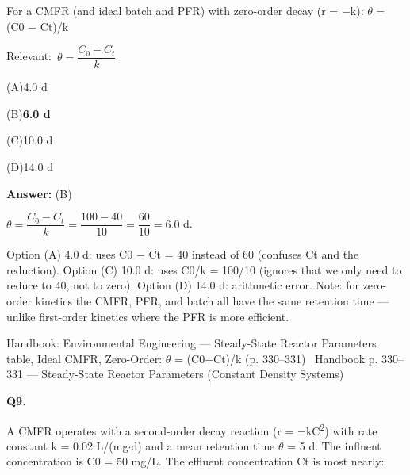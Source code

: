 \documentclass[11pt]{article}
\newcommand{\correct}[1]{\textbf{#1}\;{\color{accent}$\checkmark$}}
\newcommand{\optline}[2]{\par\noindent\hspace{1.2em}(#1)\hspace{0.6em}#2}
\begin{document}
For a CMFR (and ideal batch and PFR) with zero-order decay (r = $-$k): $\theta$ = (C0 $-$ Ct)/k\par\vspace{3pt}
{\small\color{soft}Relevant:}\ $\theta = \dfrac{C_0 - C_t}{k}$\par\vspace{3pt}
\optline{A}{4.0 d}
\optline{B}{\correct{6.0 d}}
\optline{C}{10.0 d}
\optline{D}{14.0 d}
\par\vspace{3pt}
\vspace{2pt}\par\noindent\colorbox{boxbg}{\parbox{\dimexpr\linewidth-2\fboxsep\relax}{%
\vspace{2pt}\textbf{Answer:} (B)\par\vspace{2pt}
{\small $\theta = \dfrac{C_0 - C_t}{k} = \dfrac{100 - 40}{10} = \dfrac{60}{10} = 6.0$ d.

Option (A) 4.0 d: uses C0 $-$ Ct = 40 instead of 60 (confuses Ct and the reduction). Option (C) 10.0 d: uses C0/k = 100/10 (ignores that we only need to reduce to 40, not to zero). Option (D) 14.0 d: arithmetic error. Note: for zero-order kinetics the CMFR, PFR, and batch all have the same retention time --- unlike first-order kinetics where the PFR is more efficient.}\par\vspace{2pt}
{\footnotesize\color{soft}Handbook: Environmental Engineering --- Steady-State Reactor Parameters table, Ideal CMFR, Zero-Order: $\theta$ = (C0$-$Ct)/k (p. 330--331) \textbullet\ Handbook p. 330--331 --- Steady-State Reactor Parameters (Constant Density Systems)}\vspace{2pt}
}}
\vspace{9pt}
\filbreak
\textbf{\color{accent}Q9.}\par\vspace{2pt}
A CMFR operates with a second-order decay reaction (r = $-$kC\textsuperscript{2}) with rate constant k = 0.02 L/(mg$\cdot$d) and a mean retention time $\theta$ = 5 d. The influent concentration is C0 = 50 mg/L. The effluent concentration Ct is most nearly:
\end{document}

